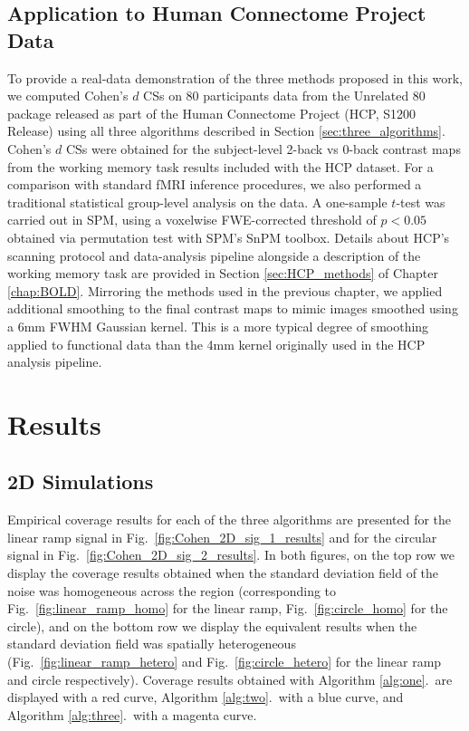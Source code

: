 \subsection{Application to Human Connectome Project Data}
To provide a real-data demonstration of the three methods proposed in this work, we computed Cohen's $d$ CSs on 80 participants data from the Unrelated 80 package released as part of the Human Connectome Project (HCP, S1200 Release) using all three algorithms described in Section \ref{sec:three_algorithms}. Cohen's $d$ CSs were obtained for the subject-level 2-back vs 0-back contrast maps from the working memory task results included with the HCP dataset. For a comparison with standard fMRI inference procedures, we also performed a traditional statistical group-level analysis on the data. A one-sample $t$-test was carried out in SPM, using a voxelwise FWE-corrected threshold of $p < 0.05$ obtained via permutation test with SPM's SnPM toolbox. Details about HCP's scanning protocol and data-analysis pipeline alongside a description of the working memory task are provided in Section \ref{sec:HCP_methods} of Chapter \ref{chap:BOLD}. Mirroring the methods used in the previous chapter, we applied additional smoothing to the final contrast maps to mimic images smoothed using a 6mm FWHM Gaussian kernel. This is a more typical degree of smoothing applied to functional data than the 4mm kernel originally used in the HCP analysis pipeline.

\section{Results}
\label{sec:simulation_results}
\subsection{2D Simulations} 
\label{sec:2D_sim_results}

Empirical coverage results for each of the three algorithms are presented for the linear ramp signal in Fig.\ \ref{fig:Cohen_2D_sig_1_results} and for the circular signal in Fig.\ \ref{fig:Cohen_2D_sig_2_results}. In both figures, on the top row we display the coverage results obtained when the standard deviation field of the noise was homogeneous across the region (corresponding to Fig.\ \ref{fig:linear_ramp_homo} for the linear ramp, Fig.\ \ref{fig:circle_homo} for the circle), and on the bottom row we display the equivalent results when the standard deviation field was spatially heterogeneous (Fig.\ \ref{fig:linear_ramp_hetero} and Fig.\ \ref{fig:circle_hetero} for the linear ramp and circle respectively). Coverage results obtained with Algorithm \ref{alg:one}.\ are displayed with a red curve, Algorithm \ref{alg:two}.\ with a blue curve, and Algorithm \ref{alg:three}.\ with a magenta curve.

